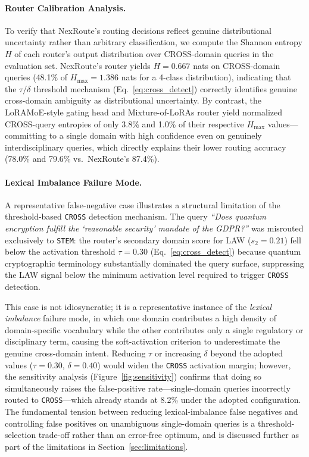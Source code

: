 \documentclass[a4paper,fleql]{cas-sc}
\begin{document}
\paragraph{Router Calibration Analysis.}
To verify that NexRoute's routing decisions reflect genuine distributional
uncertainty rather than arbitrary classification, we compute the Shannon
entropy $H$ of each router's output distribution over CROSS-domain
queries in the evaluation set.
NexRoute's router yields $H{=}0.667$ nats on CROSS-domain queries
(48.1\% of $H_{\max}{=}1.386$ nats for a 4-class distribution),
indicating that the $\tau/\delta$ threshold mechanism
(Eq.~\ref{eq:cross_detect}) correctly identifies genuine cross-domain
ambiguity as distributional uncertainty.
By contrast, the LoRAMoE-style gating head and Mixture-of-LoRAs router
yield normalized CROSS-query entropies of only 3.8\% and 1.0\%
of their respective $H_{\max}$ values---committing to a single
domain with high confidence even on genuinely interdisciplinary
queries, which directly explains their lower routing accuracy
(78.0\% and 79.6\% vs.\ NexRoute's 87.4\%).

\paragraph{Lexical Imbalance Failure Mode.}
A representative false-negative case illustrates a structural limitation of the
threshold-based \texttt{CROSS} detection mechanism. The query \textit{``Does
quantum encryption fulfill the `reasonable security' mandate of the GDPR?''}
was misrouted exclusively to \texttt{STEM}: the router's secondary domain score
for LAW ($s_2 = 0.21$) fell below the activation threshold $\tau = 0.30$
(Eq.~\ref{eq:cross_detect}) because quantum cryptographic terminology
substantially dominated the query surface, suppressing the LAW signal below the
minimum activation level required to trigger \texttt{CROSS} detection.

This case is not idiosyncratic; it is a representative instance of the
\emph{lexical imbalance} failure mode, in which one domain contributes a high
density of domain-specific vocabulary while the other contributes only a single
regulatory or disciplinary term, causing the soft-activation criterion to
underestimate the genuine cross-domain intent. Reducing $\tau$ or increasing
$\delta$ beyond the adopted values ($\tau{=}0.30$, $\delta{=}0.40$) would
widen the \texttt{CROSS} activation margin; however, the sensitivity analysis
(Figure~\ref{fig:sensitivity}) confirms that doing so simultaneously raises the
false-positive rate---single-domain queries incorrectly routed to
\texttt{CROSS}---which already stands at 8.2\% under the adopted
configuration. The fundamental tension between reducing lexical-imbalance false
negatives and controlling false positives on unambiguous single-domain queries
is a threshold-selection trade-off rather than an error-free optimum, and is
discussed further as part of the limitations in Section~\ref{sec:limitations}.
\end{document}
